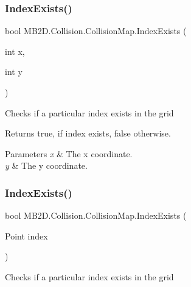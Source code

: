 \subsubsection{\texorpdfstring{Index\+Exists()}{IndexExists()}\hspace{0.1cm}{\footnotesize\ttfamily [1/2]}}
{\footnotesize\ttfamily bool M\+B2\+D.\+Collision.\+Collision\+Map.\+Index\+Exists (\begin{DoxyParamCaption}\item[{int}]{x,  }\item[{int}]{y }\end{DoxyParamCaption})\hspace{0.3cm}{\ttfamily [inline]}}



Checks if a particular index exists in the grid 

\begin{DoxyReturn}{Returns}
{\ttfamily true}, if index exists, {\ttfamily false} otherwise.
\end{DoxyReturn}

\begin{DoxyParams}{Parameters}
{\em x} & The x coordinate.\\
\hline
{\em y} & The y coordinate.\\
\hline
\end{DoxyParams}
\hypertarget{class_m_b2_d_1_1_collision_1_1_collision_map_aa90ce934e081513f78aceacab50f27da}{}\label{class_m_b2_d_1_1_collision_1_1_collision_map_aa90ce934e081513f78aceacab50f27da} 
\subsubsection{\texorpdfstring{Index\+Exists()}{IndexExists()}\hspace{0.1cm}{\footnotesize\ttfamily [2/2]}}
{\footnotesize\ttfamily bool M\+B2\+D.\+Collision.\+Collision\+Map.\+Index\+Exists (\begin{DoxyParamCaption}\item[{Point}]{index }\end{DoxyParamCaption})\hspace{0.3cm}{\ttfamily [inline]}}



Checks if a particular index exists in the grid 

